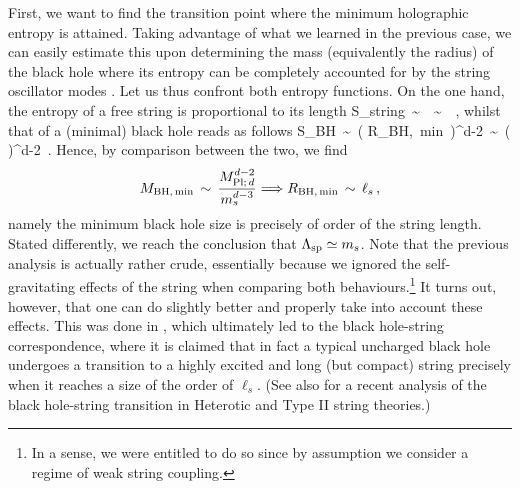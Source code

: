 First, we want to find the transition point where the minimum holographic entropy is attained. Taking advantage of what we learned in the previous case, we can easily 
estimate this upon determining the mass (equivalently the radius) of the black hole where its entropy can be completely accounted for by the string oscillator modes \cite{Susskind:1993ws}. Let us thus confront both entropy functions. On the one hand, the entropy of a free string is proportional to its length \cite{Green:2012oqa} 
%
\beq
	S_{\rm string}\, \sim\, \, \sim\, \, ,
\eeq
%
whilst that of a (minimal) black hole reads as follows
%
\beq
	S_{\rm BH}\, \sim\, \left( R_{\rm BH,\, min}\, \Mpd \right)^{d-2}\, \sim\, \left( \right)^{d-2}\, .
\eeq
%
Hence, by comparison between the two, we find
%
\begin{align}
	M_{\rm BH,\, min}\, \sim\, \frac{M_{\text{Pl;}\, d}^{d-2}}{m_s^{d-3}} \Longrightarrow R_{\rm BH,\, min}\, \sim\, \ell_s\, ,
\end{align}
%
namely the minimum black hole size is precisely of order of the string length. Stated differently, we reach the conclusion that $\Lambda_{\text{sp}} \simeq m_s$. Note that the previous analysis is actually rather crude, essentially because we ignored the self-gravitating effects of the string when comparing both behaviours.\footnote{In a sense, we were entitled to do so since by assumption we consider a regime of weak string coupling.} It turns out, however, that one can do slightly better and properly take into account these effects. This was done in \cite{Horowitz:1996nw,Horowitz:1997jc}, which ultimately led to the black hole-string correspondence, where it is claimed that in fact a typical uncharged black hole undergoes a transition to a highly excited and long (but compact) string precisely when it reaches a size of the order of $\ell_s$. (See also \cite{Chen:2021dsw} for a recent analysis of the black hole-string transition in Heterotic and Type II string theories.)

